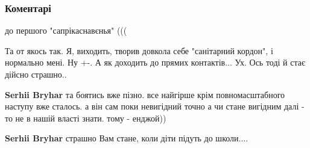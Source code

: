  
 
 
 
 
\subsubsection{Коментарі}
\label{sec:03_08_2021.fb.bryhar_sergej.1.lvov_poezd.cmt}

\begin{itemize}
 
до першого "сапрікаснавєнья" (((

\begin{itemize}
 

Та от якось так. Я, виходить, творив довкола себе "санітарний кордон", і
нормально мені. Ну +-. А як доходить до прямих контактів... Ух. Ось тоді й стає
дійсно страшно..


 
\textbf{Serhii Bryhar} та боятись вже пізно. все найгірше крім повномасштабного
наступу вже сталось. а він сам поки невигідний точно а чи стане вигідним далі -
то не в нашій власті знати. тому - енджой))

 
\textbf{Serhii Bryhar} страшно Вам стане, коли діти підуть до школи....


\end{itemize}
\end{itemize}

